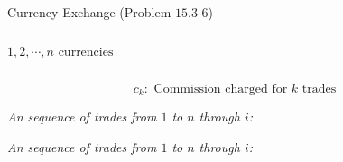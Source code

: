 
\begin{frame}{}
  \begin{exampleblock}{Currency Exchange (Problem $15.3$-$6$)}
    \begin{columns}
	\[
	  1, 2, \cdots, n \text{ currencies}
	\]

    \end{columns}

    \pause
    \vspace{0.50cm}
    \[
      c_k: \text{ Commission charged for $k$ trades}
    \]
  \end{exampleblock}
\end{frame}

\begin{frame}{}

  \pause
  \vspace{0.30cm}
  \begin{center}
    {\large \it An  sequence of trades from $1$ to $n$ through $i$:}
  \end{center}

\end{frame}

\begin{frame}{}

  \pause
  \vspace{0.20cm}
  \begin{center}
    {\large \it An  sequence of trades from $1$ to $n$ through $i$:}
  \end{center}


  \pause
  \begin{center}
    {\large \it {}}
  \end{center}
\end{frame}

